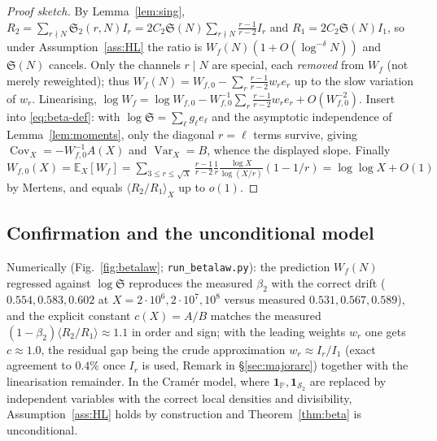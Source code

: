 \documentclass[]{interact}%
\newcommand{\PP}{\mathbb P}
\newcommand{\SSemi}{\mathcal S_2}
\newcommand{\sing}{\mathfrak S}
\newcommand{\Var}{\operatorname{Var}}
\begin{document}
\begin{proof}[Proof sketch]
By Lemma~\ref{lem:sing}, $R_2=\sum_{r\nmid N}\sing_2(r,N)I_r=2C_2\sing(N)\sum_{r\nmid N}\frac{r-1}{r-2}I_r$
and $R_1=2C_2\sing(N)I_1$, so under Assumption~\ref{ass:HL} the ratio is
$W_f(N)(1+O(\log^{-\delta}N))$ and $\sing(N)$ cancels. Only the channels
$r\mid N$ are special, each \emph{removed} from $W_f$ (not merely
reweighted); thus $W_f(N)=W_{f,0}-\sum_{r}\frac{r-1}{r-2}w_r e_r$ up
to the slow variation of $w_r$. Linearising,
$\log W_f=\log W_{f,0}-W_{f,0}^{-1}\sum_r\frac{r-1}{r-2}w_r e_r+O(W_{f,0}^{-2})$.
Insert into \eqref{eq:beta-def}: with $\log\sing=\sum_\ell g_\ell e_\ell$ and the
asymptotic independence of Lemma~\ref{lem:moments}, only the diagonal $r=\ell$ terms
survive, giving $\operatorname{Cov}_X=-W_{f,0}^{-1}A(X)$ and
$\Var_X=B$, whence the displayed slope. Finally $W_{f,0}(X)=\mathbb E_X[W_f]
=\sum_{3\le r\le\sqrt X}\frac{r-1}{r-2}\frac1r\frac{\log X}{\log(X/r)}(1-1/r)
=\log\log X+O(1)$ by Mertens, and equals $\langle R_2/R_1\rangle_X$ up to $o(1)$.
\end{proof}

\subsection{Confirmation and the unconditional model}
\label{sec:confirm}
Numerically (Fig.~\ref{fig:betalaw}; \texttt{run\_betalaw.py}): the prediction
$W_f(N)$ regressed against $\log\sing$ reproduces the measured $\beta_2$ with
the correct drift ($0.554,0.583,0.602$ at $X=2\!\cdot\!10^{6},2\!\cdot\!10^{7},10^{8}$
versus measured $0.531,0.567,0.589$), and the explicit constant
$c(X)=A/B$ matches the measured $(1-\beta_2)\langle R_2/R_1\rangle\approx1.1$ in order and
sign; with the leading weights $w_r$ one gets $c\approx1.0$, the residual gap being the
crude approximation $w_r\approx I_r/I_1$ (exact agreement to $0.4\%$ once $I_r$ is used,
Remark in \S\ref{sec:majorarc}) together with the linearisation remainder. In the
Cram\'er model, where
$\mathbf1_\PP,\mathbf1_{\SSemi}$ are replaced by independent variables with the
correct local densities and divisibility, Assumption~\ref{ass:HL} holds by
construction and Theorem~\ref{thm:beta} is unconditional.
\end{document}

